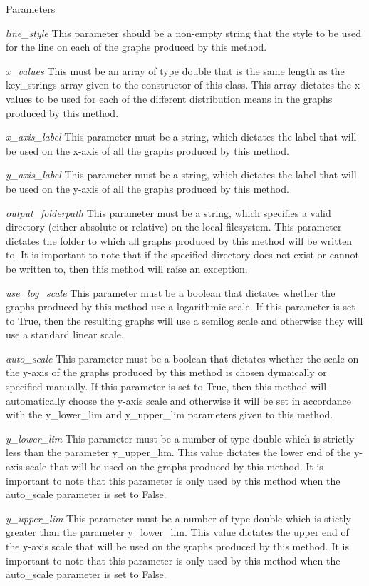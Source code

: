 \begin{DoxyParams}{Parameters}
\item[{\em line\_\-style}]This parameter should be a non-\/empty string that the style to be used for the line on each of the graphs produced by this method. \item[{\em x\_\-values}]This must be an array of type double that is the same length as the key\_\-strings array given to the constructor of this class. This array dictates the x-\/values to be used for each of the different distribution means in the graphs produced by this method. \item[{\em x\_\-axis\_\-label}]This parameter must be a string, which dictates the label that will be used on the x-\/axis of all the graphs produced by this method. \item[{\em y\_\-axis\_\-label}]This parameter must be a string, which dictates the label that will be used on the y-\/axis of all the graphs produced by this method. \item[{\em output\_\-folderpath}]This parameter must be a string, which specifies a valid directory (either absolute or relative) on the local filesystem. This parameter dictates the folder to which all graphs produced by this method will be written to. It is important to note that if the specified directory does not exist or cannot be written to, then this method will raise an exception. \item[{\em use\_\-log\_\-scale}]This parameter must be a boolean that dictates whether the graphs produced by this method use a logarithmic scale. If this parameter is set to True, then the resulting graphs will use a semilog scale and otherwise they will use a standard linear scale. \item[{\em auto\_\-scale}]This parameter must be a boolean that dictates whether the scale on the y-\/axis of the graphs produced by this method is chosen dymaically or specified manually. If this parameter is set to True, then this method will automatically choose the y-\/axis scale and otherwise it will be set in accordance with the y\_\-lower\_\-lim and y\_\-upper\_\-lim parameters given to this method. \item[{\em y\_\-lower\_\-lim}]This parameter must be a number of type double which is strictly less than the parameter y\_\-upper\_\-lim. This value dictates the lower end of the y-\/axis scale that will be used on the graphs produced by this method. It is important to note that this parameter is only used by this method when the auto\_\-scale parameter is set to False. \item[{\em y\_\-upper\_\-lim}]This parameter must be a number of type double which is stictly greater than the parameter y\_\-lower\_\-lim. This value dictates the upper end of the y-\/axis scale that will be used on the graphs produced by this method. It is important to note that this parameter is only used by this method when the auto\_\-scale parameter is set to False. \end{DoxyParams}

